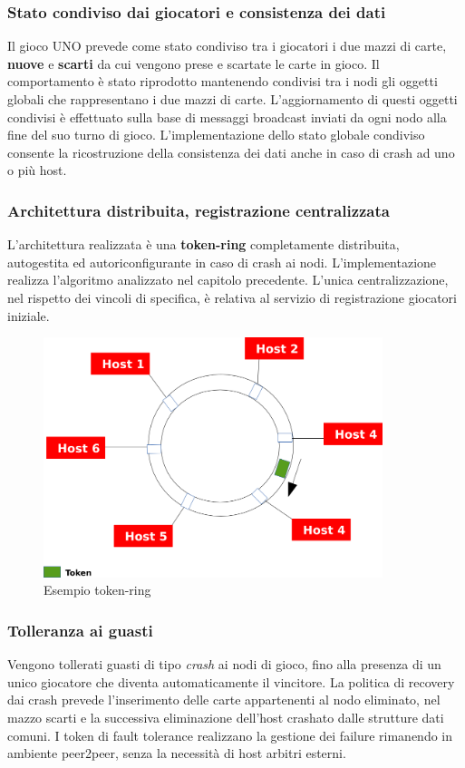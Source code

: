 \documentclass[10pt,a4paper]{article}
\begin{document}
\subsubsection{Stato condiviso dai giocatori e consistenza dei dati}
Il gioco UNO prevede come stato condiviso tra i giocatori i due mazzi di carte, \textbf{nuove} e \textbf{scarti} da cui vengono prese e scartate le carte in gioco. Il comportamento è stato riprodotto mantenendo condivisi tra i nodi gli oggetti globali che rappresentano i due mazzi di carte. L'aggiornamento di questi oggetti condivisi è effettuato sulla base di messaggi broadcast inviati da ogni nodo alla fine del suo turno di gioco. L'implementazione dello stato globale condiviso consente la ricostruzione della consistenza dei dati anche in caso di crash ad uno o più host.
 
\subsubsection{Architettura distribuita, registrazione centralizzata}
L'architettura realizzata è una \textbf{token-ring} completamente distribuita, autogestita ed autoriconfigurante in caso di crash ai nodi. L'implementazione realizza l'algoritmo analizzato nel capitolo precedente. L'unica centralizzazione, nel rispetto dei vincoli di specifica, è relativa al servizio di registrazione giocatori iniziale.

\begin{figure}[H]
\begin{center}
\includegraphics[height=7cm, keepaspectratio]{token-ring.png}
\caption{Esempio token-ring}
\end{center}
\end{figure}

\subsubsection{Tolleranza ai guasti}
Vengono tollerati guasti di tipo \textit{crash} ai nodi di gioco, fino alla presenza di un unico giocatore che diventa automaticamente il vincitore. La politica di recovery dai crash prevede l'inserimento delle carte appartenenti al nodo eliminato, nel mazzo scarti e la successiva eliminazione dell'host crashato dalle strutture dati comuni. I token di fault tolerance realizzano la gestione dei failure rimanendo in ambiente peer2peer, senza la necessità di host arbitri esterni.   
\end{document}

